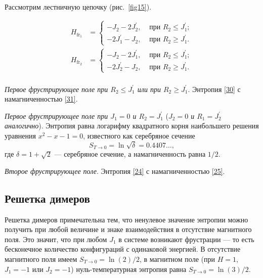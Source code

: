 Рассмотрим лестничную цепочку (рис.~\ref{fig15}). 

\[
\begin{aligned}
H_{\text{fr}_1}&=
\begin{cases}
-J_{2}-2J_{2}^{'}, & \text{ при } R_{2}\leq J_{1}^{'}; \\
-2J_{1}^{'}-J_{2}, & \text{ при } R_{2}\ge J_{1}^{'}.
\end{cases}\\
H_{\text{fr}_2}&=
\begin{cases}
-J_{2}-2J_{1}^{'}, & \text{ при } R_{2}\leq J_{1}^{'}; \\
-2J_{2}^{'}-J_{2}, & \text{ при } R_{2}\ge J_{1}^{'}.
\end{cases}\\
\end{aligned}
\]


\emph{Первое фрустрирующее поле при $R_{2}\leq J_{1}^{'}$ или при $R_{2}\ge J_{1}^{'}$}. Энтропия \eqref{30} с намагниченностью \eqref{31}.

\emph{Первое фрустрирующее поле при $J_1 = 0$ и $R_2 = J_1^{'}$} (\emph{$J_2 = 0$ и $R_1 = J_2^{'}$ аналогично}). Энтропия равна логарифму квадратного корня наибольшего решения уравнения \mbox{$x^2-x-1=0$}, известного как серебряное сечение
\begin{equation}
S_{T\rightarrow 0} = \ln \sqrt{\delta} = 0.4407\dots, 
\label{40}
\end{equation}
где $\delta = 1 + \sqrt{2}$ --- серебряное сечение, а намагниченность равна $1/2$.

\emph{Второе фрустрирующее поле}. Энтропия \eqref{24} с намагниченностью \eqref{25}.

\subsection{Решетка димеров}


Решетка димеров примечательна тем, что ненулевое значение энтропии можно получить при любой величине и знаке взаимодействия в отсутствие магнитного поля. Это значит, что при любом $J_1$ в системе возникают фрустрации --- то есть бесконечное количество конфигураций с одинаковой энергией. В отсутствие магнитного поля имеем $S_{T\rightarrow 0} = \ln(2)/2$, в магнитном поле (при $H = 1$, $J_1 = −1$ или $J_2 = −1$) нуль-температурная энтропия равна $S_{T\rightarrow 0} = \ln(3)/2$.

